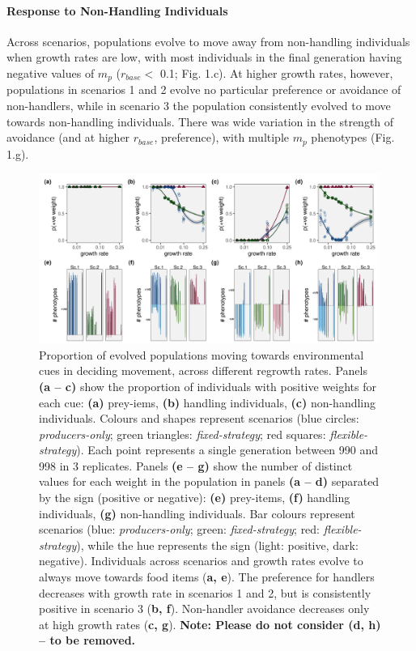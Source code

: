 \documentclass[11pt]{article}
\begin{document}
\paragraph{Response to Non-Handling Individuals}

Across scenarios, populations evolve to move away from non-handling individuals when growth rates are low, with most individuals in the final generation having negative values of $m_p$ ($r_{base} <$ 0.1; Fig. 1.c).
At higher growth rates, however, populations in scenarios 1 and 2 evolve no particular preference or avoidance of non-handlers, while in scenario 3 the population consistently evolved to move towards non-handling individuals.
There was wide variation in the strength of avoidance (and at higher $r_{base}$, preference), with multiple $m_p$ phenotypes (Fig. 1.g).

\begin{figure}[h]
    \centering
    \includegraphics[width=0.99\textwidth]{figures/fig_03_move_weight_end_vals.png}
    \caption{
        Proportion of evolved populations moving towards environmental cues in deciding movement, across different regrowth rates.
        Panels \textbf{(a -- c)} show the proportion of individuals with positive weights for each cue: \textbf{(a)} prey-iems, \textbf{(b)} handling individuals, \textbf{(c)} non-handling individuals.
        Colours and shapes represent scenarios (blue circles: \textit{producers-only}; green triangles: \textit{fixed-strategy}; red squares: \textit{flexible-strategy}).
        Each point represents a single generation between 990 and 998 in 3 replicates.
        Panels \textbf{(e -- g)} show the number of distinct values for each weight in the population in panels \textbf{(a -- d)} separated by the sign (positive or negative): \textbf{(e)} prey-items, \textbf{(f)} handling individuals, \textbf{(g)} non-handling individuals.
        Bar colours represent scenarios (blue: \textit{producers-only}; green: \textit{fixed-strategy}; red: \textit{flexible-strategy}), while the hue represents the sign (light: positive, dark: negative).
        Individuals across scenarios and growth rates evolve to always move towards food items (\textbf{a, e}).
        The preference for handlers decreases with growth rate in scenarios 1 and 2, but is consistently positive in scenario 3 (\textbf{b, f}).
        Non-handler avoidance decreases only at high growth rates (\textbf{c, g}).
        \textbf{Note: Please do not consider (d, h) -- to be removed.}
    }
    \label{fig:figure_pipeline}
\end{figure}
\end{document}
